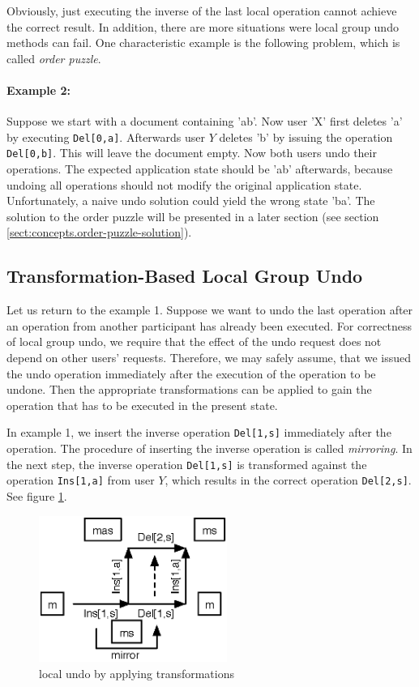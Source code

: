 Obviously, just executing the inverse of the last local operation cannot achieve the correct result. In addition, there are more situations were local group undo methods can fail. One characteristic example is the following problem, which is called \emph{order puzzle}.

\paragraph{Example 2:}
Suppose we start with a document containing 'ab'. Now user 'X' first deletes 'a' by executing \texttt{Del[0,a]}. Afterwards user $Y$ deletes 'b' by issuing the operation \texttt{Del[0,b]}. This will leave the document empty. Now both users undo their operations. The expected application state should be 'ab' afterwards, because undoing all operations should not modify the original application state. Unfortunately, a naive undo solution could yield the wrong state 'ba'. The solution to the order puzzle will be presented in a later section (see section \ref{sect:concepts.order-puzzle-solution}).

\subsection{Transformation-Based Local Group Undo}
Let us return to the example 1. Suppose we want to undo the last operation after an operation from another participant has already been executed. For correctness of local group undo, we require that the effect of the undo request does not depend on other users' requests. Therefore, we may safely assume, that we issued the undo operation immediately after the execution of the operation to be undone. Then the appropriate transformations can be applied to gain the operation that has to be executed in the present state. 

In example 1, we insert the inverse operation \texttt{Del[1,s]} immediately after the operation. The procedure of inserting the inverse operation is called \emph{mirroring}. In the next step, the inverse operation \texttt{Del[1,s]} is transformed against the operation \texttt{Ins[1,a]} from user $Y$, which results in the correct operation \texttt{Del[2,s]}. See figure \ref{fig:concepts.undobytransformation}.

\begin{figure}[htb]
 \centering
 \includegraphics[width=6.13cm,height=4.79cm]{../../images/concepts_undobytransformation.eps}
 \caption{local undo by applying transformations}
 \label{fig:concepts.undobytransformation}
\end{figure}

